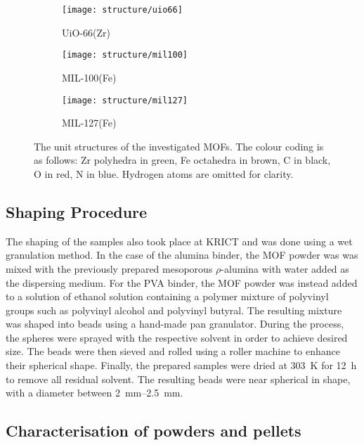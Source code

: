 \begin{figure}[htb]
	\centering
	\begin{subfigure}{0.3\textwidth}
		\texttt{[image: structure/uio66]}
		\caption{UiO-66(Zr)}
	\end{subfigure}
	\begin{subfigure}{0.3\textwidth}
		\texttt{[image: structure/mil100]}
		\caption{MIL-100(Fe)}
	\end{subfigure}
	\begin{subfigure}{0.3\textwidth}
		\texttt{[image: structure/mil127]}
		\caption{MIL-127(Fe)}
	\end{subfigure}

	\caption{The unit structures of the investigated MOFs.
		The colour coding is as follows: Zr polyhedra in green,
		Fe octahedra in brown, C in black, O in red, N in blue.
		Hydrogen atoms are omitted for clarity.}%
	\label{shaping:fgr:mofstructures}
\end{figure}




\subsection{Shaping Procedure}

The shaping of the samples also took place at KRICT and was done
using a wet granulation method. In the case of the alumina binder,
the MOF powder was was mixed with the previously prepared mesoporous
\(\rho\)-alumina with water added as the dispersing medium. For the
PVA binder, the MOF powder was instead added to a solution of
ethanol solution containing a polymer mixture of polyvinyl groups
such as polyvinyl alcohol and polyvinyl butyral. The resulting
mixture was shaped into beads using a hand-made pan granulator.
During the process, the spheres were sprayed with the respective
solvent in order to achieve desired size. The beads were then sieved
and rolled using a roller machine to enhance their spherical
shape. Finally, the prepared samples were dried at \SI{303}{\kelvin}
for \SI{12}{\hour} to remove all residual solvent.
The resulting beads were near spherical in shape, with a diameter
between \SIrange{2}{2.5}{\milli\metre}.

\subsection{Characterisation of powders and pellets}


